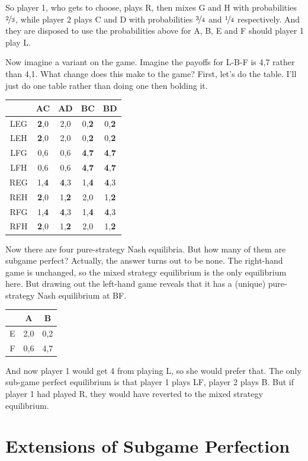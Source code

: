 \documentclass[11pt,]{article}
\begin{document}
So player 1, who gets to choose, plays R, then mixes G and H with
probabilities \(\nicefrac{2}{3}\), while player 2 plays C and D with
probabilities \(\nicefrac{3}{4}\) and \(\nicefrac{1}{4}\) respectively.
And they are disposed to use the probabilities above for A, B, E and F
should player 1 play L.

Now imagine a variant on the game. Imagine the payoffs for L-B-F is 4,7
rather than 4,1. What change does this make to the game? First, let's do
the table. I'll just do one table rather than doing one then bolding it.

\begin{longtable}[]{@{}ccccc@{}}
\toprule
& AC & AD & BC & BD\tabularnewline
\midrule
\endhead
LEG & \textbf{2},0 & 2,0 & 0,\textbf{2} & 0,\textbf{2}\tabularnewline
LEH & \textbf{2},0 & 2,0 & 0,\textbf{2} & 0,\textbf{2}\tabularnewline
LFG & 0,6 & 0,6 & \textbf{4},\textbf{7} &
\textbf{4},\textbf{7}\tabularnewline
LFH & 0,6 & 0,6 & \textbf{4},\textbf{7} &
\textbf{4},\textbf{7}\tabularnewline
REG & 1,\textbf{4} & \textbf{4},3 & 1,\textbf{4} &
\textbf{4},3\tabularnewline
REH & \textbf{2},0 & 1,\textbf{2} & 2,0 & 1,\textbf{2}\tabularnewline
RFG & 1,\textbf{4} & \textbf{4},3 & 1,\textbf{4} &
\textbf{4},3\tabularnewline
RFH & \textbf{2},0 & 1,\textbf{2} & 2,0 & 1,\textbf{2}\tabularnewline
\bottomrule
\end{longtable}

Now there are four pure-strategy Nash equilibria. But how many of them
are subgame perfect? Actually, the answer turns out to be none. The
right-hand game is unchanged, so the mixed strategy equilibrium is the
only equilibrium here. But drawing out the left-hand game reveals that
it has a (unique) pure-strategy Nash equilibrium at BF.

\begin{longtable}[]{@{}rcc@{}}
\toprule
& A & B\tabularnewline
\midrule
\endhead
E & 2,0 & 0,2\tabularnewline
F & 0,6 & 4,7\tabularnewline
\bottomrule
\end{longtable}

And now player 1 would get 4 from playing L, so she would prefer that.
The only sub-game perfect equilibrium is that player 1 plays LF, player
2 plays B. But if player 1 had played R, they would have reverted to the
mixed strategy equilibrium.

\hypertarget{extensions-of-subgame-perfection}{%
\section{Extensions of Subgame
Perfection}\label{extensions-of-subgame-perfection}}
\end{document}
